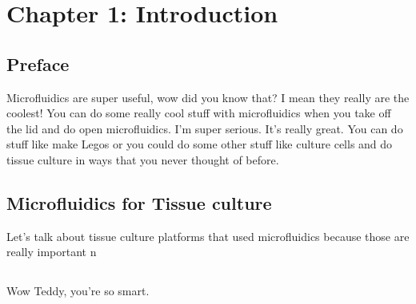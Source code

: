 \chapter{Chapter 1: Introduction}\label{Chap:Introduction}

\section{Preface}
Microfluidics are super useful, wow did you know that? I mean they really are the coolest! You can do some really cool stuff with microfluidics when you take off the lid and do open microfluidics. I'm super serious. It's really great. You can do stuff like make Legos or you could do some other stuff like culture cells and do tissue culture in ways that you never thought of before.

\section{Microfluidics for Tissue culture}
Let's talk about tissue culture platforms that used microfluidics because those are really important  n


\section{}
Wow Teddy, you're so smart.





